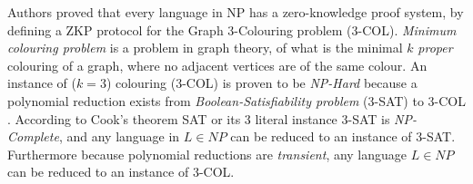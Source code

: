 Authors \cite{GMW} proved that every language in NP has a zero-knowledge proof system, by defining a ZKP protocol for the Graph 3-Colouring problem (3-COL).
\textit{Minimum colouring problem} is a problem in graph theory, of what is the minimal $k$ \textit{proper} colouring of a graph, where no adjacent vertices are of the same colour.
An instance of ($k=3$) colouring (3-COL) is proven to be \textit{NP-Hard} because a polynomial reduction exists from \textit{Boolean-Satisfiability problem} (3-SAT) to 3-COL \cite{mouatadid2014introduction}.
According to Cook's theorem \cite{cook1971complexity} SAT or its 3 literal instance 3-SAT is \textit{NP-Complete}, and any language in $L \in NP$ can be reduced to an instance of 3-SAT. 
Furthermore because polynomial reductions are \textit{transient}, any language $L \in NP$ can be reduced to an instance of 3-COL.

%
%

